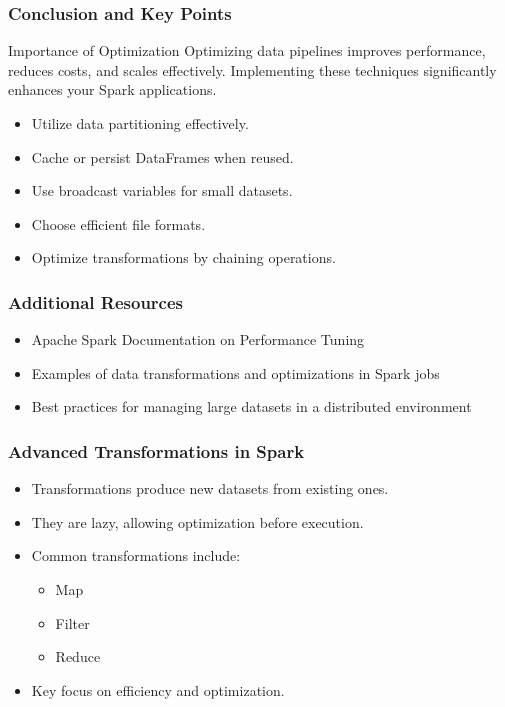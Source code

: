\documentclass[aspectratio=169]{beamer}
\begin{document}
\begin{frame}
    \frametitle{Conclusion and Key Points}
    \begin{block}{Importance of Optimization}
        Optimizing data pipelines improves performance, reduces costs, and scales effectively. Implementing these techniques significantly enhances your Spark applications.
    \end{block}
    \begin{itemize}
        \item Utilize data partitioning effectively.
        \item Cache or persist DataFrames when reused.
        \item Use broadcast variables for small datasets.
        \item Choose efficient file formats.
        \item Optimize transformations by chaining operations.
    \end{itemize}
\end{frame}

\begin{frame}
    \frametitle{Additional Resources}
    \begin{itemize}
        \item Apache Spark Documentation on Performance Tuning
        \item Examples of data transformations and optimizations in Spark jobs
        \item Best practices for managing large datasets in a distributed environment
    \end{itemize}
\end{frame}

\begin{frame}
    \frametitle{Advanced Transformations in Spark}
    \begin{itemize}
        \item Transformations produce new datasets from existing ones.
        \item They are lazy, allowing optimization before execution.
        \item Common transformations include:
        \begin{itemize}
            \item Map
            \item Filter
            \item Reduce
        \end{itemize}
        \item Key focus on efficiency and optimization.
    \end{itemize}
\end{frame}
\end{document}
